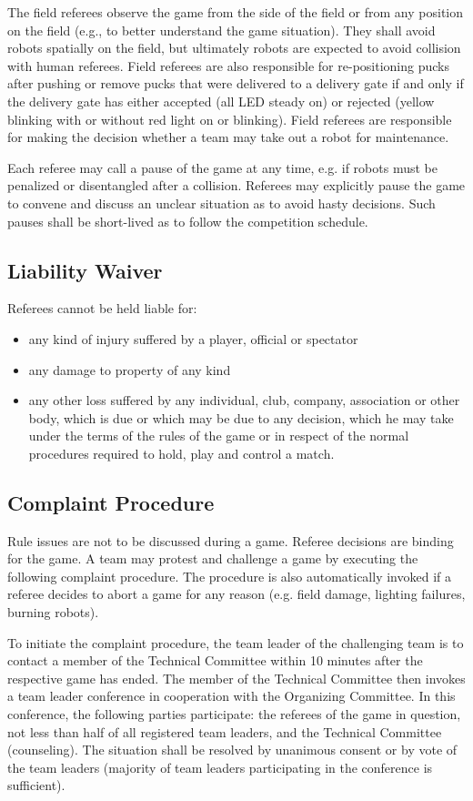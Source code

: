 \documentclass[12pt,twoside]{article}
\begin{document}
The field referees observe the game from the side of the field or from
any position on the field (e.g., to better understand the game
situation). They shall avoid robots spatially on the field, but
ultimately robots are expected to avoid collision with human
referees. Field referees are also responsible for re-positioning pucks
after pushing or remove pucks that were delivered to a delivery gate
if and only if the delivery gate has either accepted (all LED steady
on) or rejected (yellow blinking with or without red light on or blinking). Field
referees are responsible for making the decision whether a team may
take out a robot for maintenance.

Each referee may call a pause of the game at any time, e.g. if robots
must be penalized or disentangled after a collision. Referees may
explicitly pause the game to convene and discuss an unclear situation
as to avoid hasty decisions. Such pauses shall be short-lived as to
follow the competition schedule. %

\subsection{Liability Waiver}
Referees cannot be held liable for:
\begin{itemize}
\item any kind of injury suffered by a player, official or spectator
\item any damage to property of any kind
\item any other loss suffered by any individual, club, company,
  association or other body, which is due or which may be due to any
  decision, which he may take under the terms of the rules of the game
  or in respect of the normal procedures required to hold, play and
  control a match.
\end{itemize}

\subsection{Complaint Procedure}
Rule issues are not to be discussed during a game. Referee decisions
are binding for the game. A team may protest and challenge a game by
executing the following complaint procedure. The procedure is also
automatically invoked if a referee decides to abort a game for any
reason (e.g. field damage, lighting failures, burning robots).

To initiate the complaint procedure, the team leader of the
challenging team is to contact a member of the Technical Committee
within 10 minutes after the respective game has ended. The member of
the Technical Committee then invokes a team leader conference in
cooperation with the Organizing Committee. In this conference, the
following parties participate: the referees of the game in question,
not less than half of all registered team leaders, and the Technical
Committee (counseling). The situation shall be resolved by unanimous
consent or by vote of the team leaders (majority of team leaders
participating in the conference is sufficient).
\end{document}
